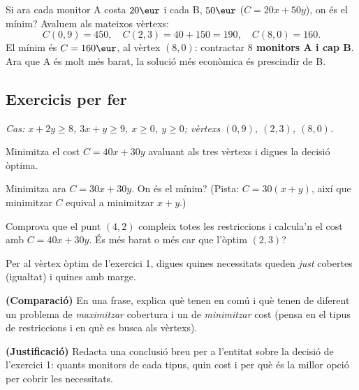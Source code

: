 \begin{exresolt}
Si ara cada monitor A costa $20\eur$ i cada B, $50\eur$ ($C=20x+50y$), on és el mínim?
\solucio
Avaluem als mateixos vèrtexs:
\[
C(0,9)=450,\quad C(2,3)=40+150=190,\quad C(8,0)=160.
\]
El mínim és $C=160\eur$, al vèrtex $(8,0)$: contractar \textbf{$8$ monitors A i cap B}.
Ara que A és molt més barat, la solució més econòmica és prescindir de B.
\end{exresolt}

\subsection{Exercicis per fer}

\noindent\textit{Cas: $x+2y\ge 8$, $3x+y\ge 9$, $x\ge 0$, $y\ge 0$; vèrtexs $(0,9)$,
$(2,3)$, $(8,0)$.}

\begin{exercicis}
\begin{exlist}
  \item Minimitza el cost $C=40x+30y$ avaluant als tres vèrtexs i digues la decisió
        òptima.
  \item Minimitza ara $C=30x+30y$. On és el mínim? (Pista: $C=30(x+y)$, així que
        minimitzar $C$ equival a minimitzar $x+y$.)
  \item Comprova que el punt $(4,2)$ compleix totes les restriccions i calcula'n el
        cost amb $C=40x+30y$. És més barat o més car que l'òptim $(2,3)$?
  \item Per al vèrtex òptim de l'exercici 1, digues quines necessitats queden
        \emph{just} cobertes (igualtat) i quines amb marge.
  \item \textbf{(Comparació)} En una frase, explica què tenen en comú i què tenen de
        diferent un problema de \emph{maximitzar} cobertura i un de \emph{minimitzar}
        cost (pensa en el tipus de restriccions i en què es busca als vèrtexs).
  \item \textbf{(Justificació)} Redacta una conclusió breu per a l'entitat sobre la
        decisió de l'exercici 1: quants monitors de cada tipus, quin cost i per què és
        la millor opció per cobrir les necessitats.
\end{exlist}
\end{exercicis}

